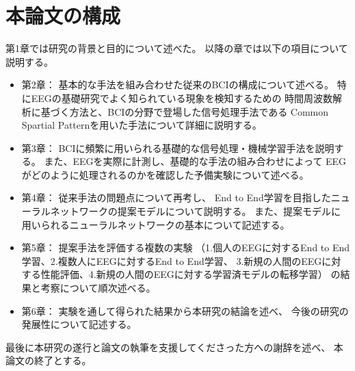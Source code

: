 \section{本論文の構成}
第1章では研究の背景と目的について述べた。
以降の章では以下の項目について説明する。
\begin{itemize}
    \item 第2章：
    基本的な手法を組み合わせた従来のBCIの構成について述べる。
    特にEEGの基礎研究でよく知られている現象を検知するための
    時間周波数解析に基づく方法と、BCIの分野で登場した信号処理手法である
    Common Spartial Patternを用いた手法について詳細に説明する。
    \item 第3章：
    BCIに頻繁に用いられる基礎的な信号処理・機械学習手法を説明する。
    また、EEGを実際に計測し、基礎的な手法の組み合わせによって
    EEGがどのように処理されるのかを確認した予備実験について述べる。
    \item 第4章：
    従来手法の問題点について再考し、
    End to End学習を目指したニューラルネットワークの提案モデルについて説明する。
    また、提案モデルに用いられるニューラルネットワークの基本について記述する。
    \item 第5章：
    提案手法を評価する複数の実験
    （1.個人のEEGに対するEnd to End学習、2.複数人にEEGに対するEnd to End学習、
    3.新規の人間のEEGに対する性能評価、4.新規の人間のEEGに対する学習済モデルの転移学習）
    の結果と考察について順次述べる。
    \item 第6章：
    実験を通して得られた結果から本研究の結論を述べ、
    今後の研究の発展性について記述する。
\end{itemize}
最後に本研究の遂行と論文の執筆を支援してくださった方への謝辞を述べ、
本論文の終了とする。